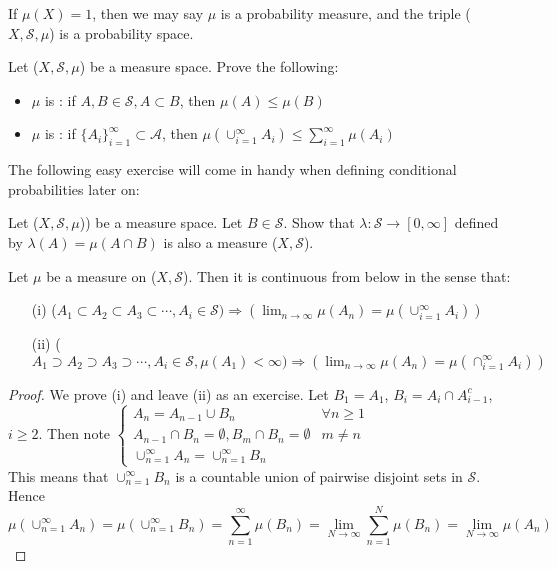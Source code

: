 \documentclass[11pt]{scrartcl}
\begin{document}
\begin{example}
If $\mu(X)=1$, then we may say $\mu$ is a probability measure, and the triple ($X,\mathcal{S},\mu$) is a probability space.
\end{example}



\begin{exercise}
Let ($X,\mathcal{S},\mu$) be a measure space. Prove the following:
\begin{itemize}
\item $\mu$ is : if $A, B \in \mathcal{S}, A \subset B$, then $\mu(A)\leq \mu(B)$
\item $\mu$ is : if $\{A_i\}_{i=1}^\infty \subset \mathcal{A}$, then $\mu(\cup_{i=1}^\infty A_i) \leq \sum_{i=1}^\infty \mu(A_i)$
\end{itemize}
\end{exercise}

The following easy exercise will come in handy when defining conditional probabilities later on:

\begin{exercise}
Let ($X,\mathcal{S},\mu$)) be a measure space. Let $B \in \mathcal{S}$. Show that $\lambda : \mathcal{S} \rightarrow [0,\infty]$ defined by $\lambda(A) = \mu(A\cap B)$ is also a measure ($X,\mathcal{S}$). 
\end{exercise}

\begin{theorem}
Let $\mu$ be a measure on ($X,\mathcal{S}$). Then it is continuous from below in the sense that:
\begin{itemize}
\item[(i)] ($A_1 \subset A_2 \subset A_3 \subset \cdots , A_i \in \mathcal{S}) \Rightarrow (\lim_{n\rightarrow \infty} \mu(A_n) = \mu(\cup_{i=1}^\infty A_i) )$
\item[(ii)] ($A_1 \supset A_2 \supset A_3 \supset \cdots , A_i \in \mathcal{S}, \mu(A_1) < \infty) \Rightarrow (\lim_{n\rightarrow \infty} \mu(A_n) = \mu(\cap_{i=1}^\infty A_i) )$
\end{itemize}
\end{theorem}

\begin{proof}
We prove (i) and leave (ii) as an exercise. Let $B_1 = A_1$, $B_i = A_i \cap A_{i-1}^c$, $i\geq 2$. Then note $\begin{cases}
A_n = A_{n-1} \cup B_n & \forall n\geq 1 \\
A_{n-1} \cap B_n = \emptyset, B_m \cap B_n = \emptyset &  m\neq n \\
\cup_{n=1}^\infty A_n = \cup_{n=1}^\infty B_n
\end{cases}$\\
This means that $ \cup_{n=1}^\infty B_n$ is a countable union of pairwise disjoint sets in $\mathcal{S}$. 
Hence 
$$\mu(\cup_{n=1}^\infty A_n) = \mu(\cup_{n=1}^\infty B_n) = \sum_{n=1}^\infty \mu(B_n) = \lim_{N \rightarrow \infty} \sum_{n=1}^N \mu(B_n) = \lim_{N\rightarrow \infty} \mu(A_n)
$$
\end{proof}
\end{document}
